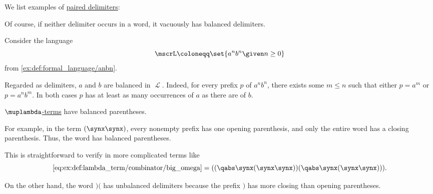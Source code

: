 \begin{example}\label{ex:def:paired_delimiters}
  We list examples of \hyperref[def:paired_delimiters]{paired delimiters}:
  \begin{thmenum}
     Of course, if neither delimiter occurs in a word, it vacuously has balanced delimiters.

     Consider the language
    \begin{equation*}
      \mscrL \coloneqq \set{ a^n b^n \given n \geq 0 }
    \end{equation*}
    from \cref{ex:def:formal_language/anbn}.

    Regarded as delimiters, \( a \) and \( b \) are balanced in \( \mscrL \). Indeed, for every prefix \( p \) of \( a^n b^n \), there exists some \( m \leq n \) such that either \( p = a^m \) or \( p = a^n b^m \). In both cases \( p \) has at least as many occurrences of \( a \) as there are of \( b \).

     \hyperref[def:lambda_term]{\( \muplambda \)-terms} have balanced parentheses.

    For example, in the term \( (\synx \synx) \), every nonempty prefix has one opening parenthesis, and only the entire word has a closing parenthesis. Thus, the word has balanced parentheses.

    This is straightforward to verify in more complicated terms like
    \begin{equation*}
      \ref{eq:ex:def:lambda_term/combinator/big_omega} = ((\qabs \synx (\synx \synx)) (\qabs \synx (\synx \synx))).
    \end{equation*}

     On the other hand, the word \( )( \) has unbalanced delimiters because the prefix \( ) \) has more closing than opening parentheses.
  \end{thmenum}
\end{example}

